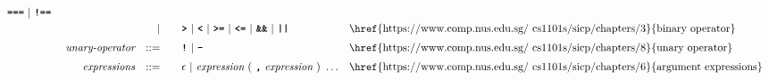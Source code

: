 \begin{alignat*}{9}
                                   \textbf{\texttt{===}}\ |\ \textbf{\texttt{!==}}\ \\
&&                       && |  &\quad &&  \texttt{\textbf{>}}\ |\ \texttt{\textbf{<}}\ |\ \texttt{\textbf{>=}}\ |\ \texttt{\textbf{<=}}\
                                          |\ \textbf{\texttt{\&\&}}\ |\ \texttt{\textbf{||}}
                                          && \textrm{\href{https://www.comp.nus.edu.sg/~cs1101s/sicp/chapters/3}{binary operator}}\\[1mm]
&& \textit{unary-operator}    
                        && ::= &\quad && \textbf{\texttt{!}}\ |\ \textbf{\texttt{-}}
                        && \textrm{\href{https://www.comp.nus.edu.sg/~cs1101s/sicp/chapters/8}{unary operator}}\\[1mm]
&& \textit{expressions}  && ::= &\quad && \epsilon\ | \ \textit{expression}\ (
                                                               \ \textbf{\texttt{,}} \
                                                                 \textit{expression} \ 
                                                                      )\ \ldots
                                                            && \textrm{\href{https://www.comp.nus.edu.sg/~cs1101s/sicp/chapters/6}{argument expressions}}
\end{alignat*}

